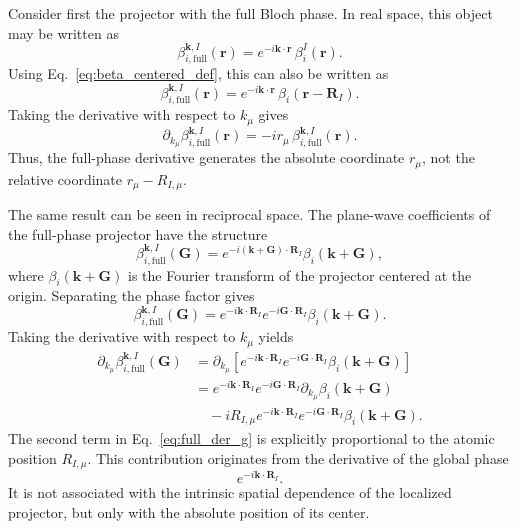 \documentclass[11pt]{article}
\begin{document}
Consider first the projector with the full Bloch phase. In real space,
this object may be written as
\begin{equation}
\beta_{i,\mathrm{full}}^{\mathbf k,I}(\mathbf r)
=
e^{-i\mathbf k\cdot\mathbf r}\,
\beta_i^I(\mathbf r) .
\label{eq:beta_full_real}
\end{equation}
Using Eq.~\eqref{eq:beta_centered_def}, this can also be written as
\begin{equation}
\beta_{i,\mathrm{full}}^{\mathbf k,I}(\mathbf r)
=
e^{-i\mathbf k\cdot\mathbf r}\,
\beta_i(\mathbf r-\mathbf R_I) .
\end{equation}
Taking the derivative with respect to $k_\mu$ gives
\begin{equation}
\partial_{k_\mu}
\beta_{i,\mathrm{full}}^{\mathbf k,I}(\mathbf r)
=
-i r_\mu\,
\beta_{i,\mathrm{full}}^{\mathbf k,I}(\mathbf r) .
\label{eq:full_der_real}
\end{equation}
Thus, the full-phase derivative generates the absolute coordinate
$r_\mu$, not the relative coordinate $r_\mu-R_{I,\mu}$.

The same result can be seen in reciprocal space. The plane-wave
coefficients of the full-phase projector have the structure
\begin{equation}
\beta_{i,\mathrm{full}}^{\mathbf k,I}(\mathbf G)
=
e^{-i(\mathbf k+\mathbf G)\cdot\mathbf R_I}
\beta_i(\mathbf k+\mathbf G),
\label{eq:beta_full_g}
\end{equation}
where $\beta_i(\mathbf k+\mathbf G)$ is the Fourier transform of the
projector centered at the origin. Separating the phase factor gives
\begin{equation}
\beta_{i,\mathrm{full}}^{\mathbf k,I}(\mathbf G)
=
e^{-i\mathbf k\cdot\mathbf R_I}
e^{-i\mathbf G\cdot\mathbf R_I}
\beta_i(\mathbf k+\mathbf G).
\label{eq:beta_full_g_sep}
\end{equation}
Taking the derivative with respect to $k_\mu$ yields
\begin{align}
\partial_{k_\mu}
\beta_{i,\mathrm{full}}^{\mathbf k,I}(\mathbf G)
&=
\partial_{k_\mu}
\left[
e^{-i\mathbf k\cdot\mathbf R_I}
e^{-i\mathbf G\cdot\mathbf R_I}
\beta_i(\mathbf k+\mathbf G)
\right]
\nonumber\\
&=
e^{-i\mathbf k\cdot\mathbf R_I}
e^{-i\mathbf G\cdot\mathbf R_I}
\partial_{k_\mu}\beta_i(\mathbf k+\mathbf G)
\nonumber\\
&\quad
-iR_{I,\mu}
e^{-i\mathbf k\cdot\mathbf R_I}
e^{-i\mathbf G\cdot\mathbf R_I}
\beta_i(\mathbf k+\mathbf G).
\label{eq:full_der_g}
\end{align}
The second term in Eq.~\eqref{eq:full_der_g} is explicitly proportional
to the atomic position $R_{I,\mu}$. This contribution originates from
the derivative of the global phase
\begin{equation}
e^{-i\mathbf k\cdot\mathbf R_I}.
\end{equation}
It is not associated with the intrinsic spatial dependence of the
localized projector, but only with the absolute position of its center.
\end{document}

